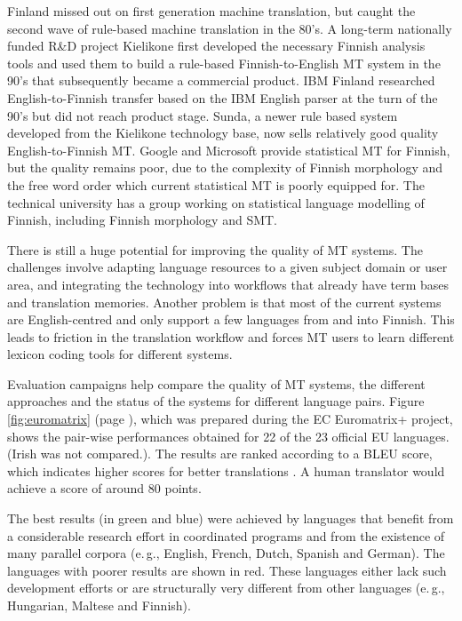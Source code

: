 \begin{multicols}{2}

Finland missed out on first generation machine translation, but caught the second wave of rule-based machine translation in the 80’s. A long-term nationally funded R\&D project Kielikone first developed the necessary Finnish analysis tools and used them to build a rule-based Finnish-to-English MT system in the 90’s that subsequently became a commercial product. IBM Finland researched English-to-Finnish transfer based on the IBM English parser at the turn of the 90’s but did not reach product stage. Sunda, a newer rule based system developed from the Kielikone technology base, now sells relatively good quality English-to-Finnish MT. Google and Microsoft provide statistical MT for Finnish, but the quality remains poor, due to the complexity of Finnish morphology and the free word order which current statistical MT is poorly equipped for. The technical university has a group working on statistical language modelling of Finnish, including Finnish morphology and SMT.

There is still a huge potential for improving the quality of MT systems. The challenges involve adapting language resources to a given subject domain or user area, and integrating the technology into workflows that already have term bases and translation memories. Another problem is that most of the current systems are English-centred and only support a few languages from and into Finnish. This leads to friction in the translation workflow and forces MT users to learn different lexicon coding tools for different systems.

Evaluation campaigns help compare the quality of MT systems, the different approaches and the status of the systems for different language pairs. Figure \ref{fig:euromatrix} (page \pageref{fig:euromatrix}), which was prepared during the EC Euromatrix+ project, shows the pair-wise performances obtained for 22 of the 23 official EU languages. (Irish was not compared.). The results are ranked according to a BLEU score, which indicates higher scores for better translations \cite{BLEU}. A human translator would achieve a score of around 80 points.

The best results (in green and blue) were achieved by languages that benefit from a considerable research effort in coordinated programs and from the existence of many parallel corpora (e.\,g., English, French, Dutch, Spanish and German). The languages with poorer results are shown in red. These languages either lack such development efforts or are structurally very different from other languages (e.\,g., Hungarian, Maltese and Finnish).


\end{multicols}
